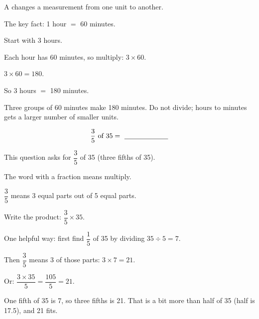 \begin{words}
  \item A changes a measurement from one unit to another.
  \item The key fact: 1 hour $=$ 60 minutes.
\end{words}

\begin{steps}
  \item Start with 3 hours.
  \item Each hour has 60 minutes, so multiply: $3 \times 60$.
  \item $3 \times 60 = 180$.
  \item So 3 hours $=$ 180 minutes.
\end{steps}


Three groups of 60 minutes make 180 minutes. Do not divide; hours to minutes
gets a larger number of smaller units.


\[ \frac{3}{5} \text{ of } 35 = \ \underline{\hspace{2.2cm}} \]


This question asks for $\dfrac{3}{5}$ of 35 (three fifths of 35).

\begin{words}
  \item The word with a fraction means multiply.
  \item $\dfrac{3}{5}$ means 3 equal parts out of 5 equal parts.
\end{words}

\begin{steps}
  \item Write the product: $\dfrac{3}{5} \times 35$.
  \item One helpful way: first find $\dfrac{1}{5}$ of 35 by dividing
        $35 \div 5 = 7$.
  \item Then $\dfrac{3}{5}$ means 3 of those parts: $3 \times 7 = 21$.
  \item Or: $\dfrac{3 \times 35}{5} = \dfrac{105}{5} = 21$.
\end{steps}


One fifth of 35 is 7, so three fifths is 21. That is a bit more than half of 35
(half is 17.5), and 21 fits.

